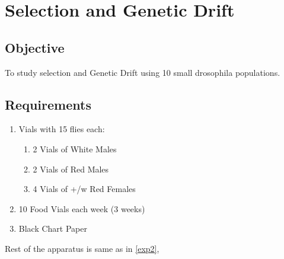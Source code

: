 \chapter{Selection and Genetic Drift}
\section{Objective}
To study selection and Genetic Drift using 10 small drosophila populations.

\section{Requirements}
	\begin{enumerate}
		\item Vials with 15 flies each:
		\begin{enumerate}
			\item 2 Vials of White Males
			\item 2 Vials of Red Males
			\item 4 Vials of +/w Red Females		
		\end{enumerate}
		\item 10 Food Vials each week (3 weeks)
		\item Black Chart Paper
	\end{enumerate}
	Rest of the apparatus is same as in \autoref{exp2}, 

